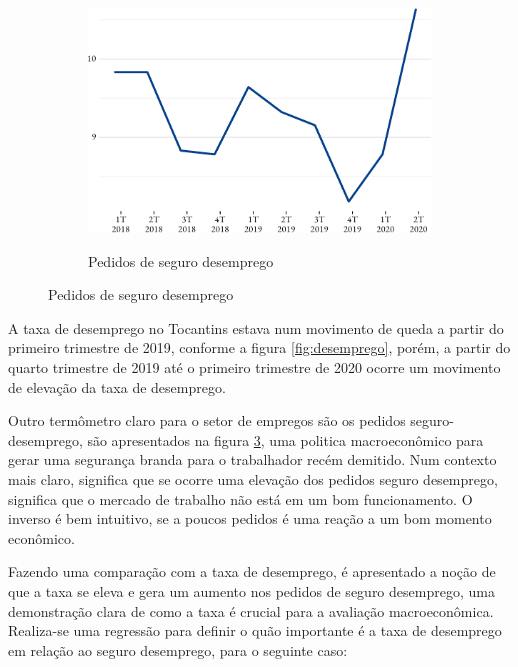 \begin{figure}[!h]
\begin{subfigure}{\linewidth}
		\label{fig:ocupada}
	\end{subfigure}
	\begin{subfigure}{\linewidth}
		\caption{Pedidos de seguro desemprego}
		\includegraphics{fig/pedido_segudo_desem-1.pdf}
		\label{fig:seguro}
	\end{subfigure}
\end{figure}

\par A taxa de desemprego no Tocantins estava num movimento de queda a partir do primeiro trimestre de 2019, conforme a figura \ref{fig:desemprego}, porém, a partir do quarto trimestre de 2019 até o primeiro trimestre de 2020 ocorre um movimento de elevação da taxa de desemprego.



\par Outro termômetro claro para o setor de empregos são os pedidos seguro-desemprego, são apresentados na figura \ref{fig:seguro}, uma politica macroeconômico para gerar uma segurança branda para o trabalhador recém demitido. Num contexto mais claro, significa que se ocorre uma elevação dos pedidos seguro desemprego, significa que o mercado de trabalho não está em um bom funcionamento. O inverso é bem intuitivo, se a poucos pedidos é uma reação a um bom momento econômico.

\par Fazendo uma comparação com a taxa de desemprego, é apresentado a noção de que a taxa se eleva e gera um aumento nos pedidos de seguro desemprego, uma demonstração clara de como a taxa é crucial para a avaliação macroeconômica. Realiza-se uma regressão para definir o quão importante é a taxa de desemprego em relação ao seguro desemprego, para o seguinte caso:

